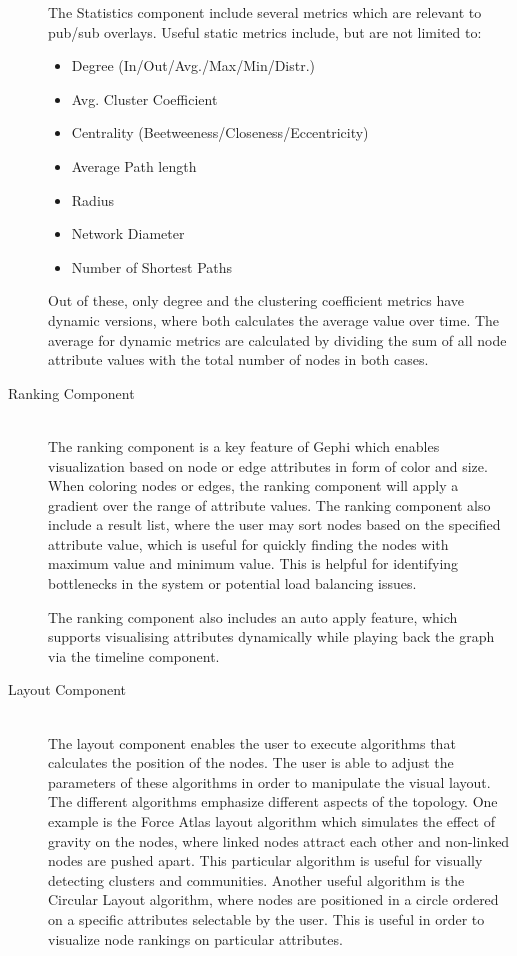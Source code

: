 \begin{description}
    The Statistics component include several metrics which are relevant
    to pub/sub overlays. Useful static metrics include, but are not
    limited to:

    \begin{itemize}
        \item{Degree (In/Out/Avg./Max/Min/Distr.)}
        \item{Avg. Cluster Coefficient}
        \item{Centrality (Beetweeness/Closeness/Eccentricity)}
        \item{Average Path length}
        \item{Radius}
        \item{Network Diameter}
        \item{Number of Shortest Paths}
    \end{itemize}

    Out of these, only degree and the clustering coefficient metrics have dynamic
    versions, where both calculates the average value over time. The
    average for dynamic metrics are calculated by dividing the sum of
    all node attribute values with the total number of nodes in both
    cases.

\item[Ranking Component] \hfill \\

    The ranking component is a key feature of Gephi which enables
    visualization based on node or edge attributes in form of color
    and size. When coloring nodes or edges, the ranking component
    will apply a gradient over the range of attribute values. The
    ranking component also include a result list, where the user may
    sort nodes based on the specified attribute value, which is
    useful for quickly finding the nodes with maximum value and
    minimum value. This is helpful for identifying bottlenecks in
    the system or potential load balancing issues.

    The ranking component also includes an auto apply feature, which
    supports visualising attributes dynamically while playing back the
    graph via the timeline component.

\item[Layout Component] \hfill \\

    The layout component enables the user to execute algorithms that
    calculates the position of the nodes. The user is able to adjust the
    parameters of these algorithms in order to manipulate the visual
    layout. The different algorithms emphasize different aspects of the
    topology. One example is the Force Atlas layout algorithm which
    simulates the effect of gravity on the nodes, where linked nodes
    attract each other and non-linked nodes are pushed apart. This
    particular algorithm is useful for visually detecting clusters and
    communities. Another useful algorithm is the Circular Layout
    algorithm, where nodes are positioned in a circle ordered on a
    specific attributes selectable by the user. This is useful in order
    to visualize node rankings on particular attributes.


\end{description}
